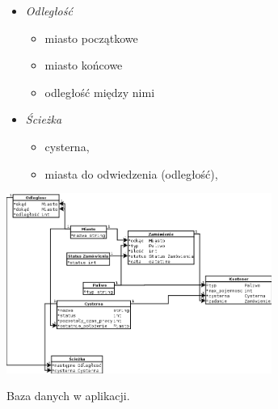 \documentclass[11pt,a4paper,oneside]{mwart}
\begin{document}
\begin{itemize}
\begin{itemize}
    \end{itemize}
    \item \emph{Odległość} %
    \begin{itemize}
      \item miasto początkowe
      \item miasto końcowe
      \item odległość między nimi
    \end{itemize}
    \item \emph{Ścieżka}  
    \begin{itemize}
      \item cysterna,
      \item miasta do odwiedzenia (odległość),
    \end{itemize}
\end{itemize}

\begin{schemat}
  \centering
  \includegraphics[width=0.65\textwidth]{pics/baza.png}
  \caption{Baza danych w aplikacji.}
  \label{fig:baza}
\end{schemat}

\end{document}
